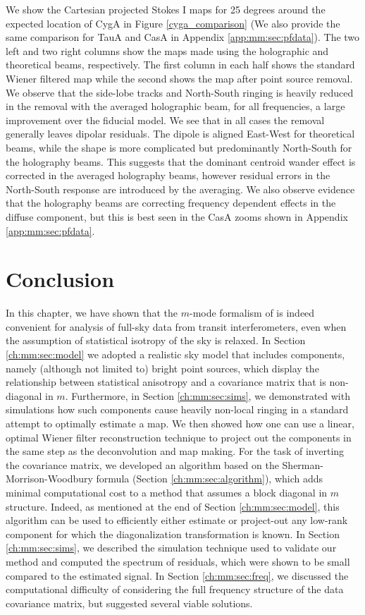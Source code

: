 We show the Cartesian projected Stokes I maps for 25 degrees around the expected location of CygA in Figure \ref{cyga_comparison} (We also provide the same comparison for TauA and CasA in Appendix \ref{app:mm:sec:pfdata}). The two left and two right columns show the maps made using the holographic and theoretical beams, respectively. The first column in each half shows the standard Wiener filtered map while the second shows the map after point source removal. We observe that the side-lobe tracks and North-South ringing is heavily reduced in the removal with the averaged holographic beam, for all frequencies, a large improvement over the fiducial model. We see that in all cases the removal generally leaves dipolar residuals. The dipole is aligned East-West for theoretical beams, while the shape is more complicated but predominantly North-South for the holography beams. This suggests that the dominant centroid wander effect is corrected in the averaged holography beams, however residual errors in the North-South response are introduced by the averaging. We also observe evidence that the holography beams are correcting frequency dependent effects in the diffuse component, but this is best seen in the CasA zooms shown in Appendix \ref{app:mm:sec:pfdata}.

\section{Conclusion}
\label{ch:mm:sec:conclusions}

In this chapter, we have shown that the $m$-mode formalism of \cite{mmodes1, mmodes2} is indeed convenient for analysis of full-sky data from transit interferometers, even when the assumption of statistical isotropy of the sky is relaxed. In Section \ref{ch:mm:sec:model} we adopted a realistic sky model that includes components, namely (although not limited to) bright point sources, which display the relationship between statistical anisotropy and a covariance matrix that is non-diagonal in $m$. Furthermore, in Section \ref{ch:mm:sec:sims}, we demonstrated with simulations how such components cause heavily non-local ringing in a standard attempt to optimally estimate a map. We then showed how one can use a linear, optimal Wiener filter reconstruction technique to project out the components in the same step as the deconvolution and map making. For the task of inverting the covariance matrix, we developed an algorithm based on the Sherman-Morrison-Woodbury formula (Section \ref{ch:mm:sec:algorithm}), which adds minimal computational cost to a method that assumes a block diagonal in $m$ structure. Indeed, as mentioned at the end of Section \ref{ch:mm:sec:model}, this algorithm can be used to efficiently either estimate or project-out any low-rank component for which the diagonalization transformation is known. In Section \ref{ch:mm:sec:sims}, we described the simulation technique used to validate our method and computed the spectrum of residuals, which were shown to be small compared to the estimated signal. In Section \ref{ch:mm:sec:freq}, we discussed the computational difficulty of considering the full frequency structure of the data covariance matrix, but suggested several viable solutions.


